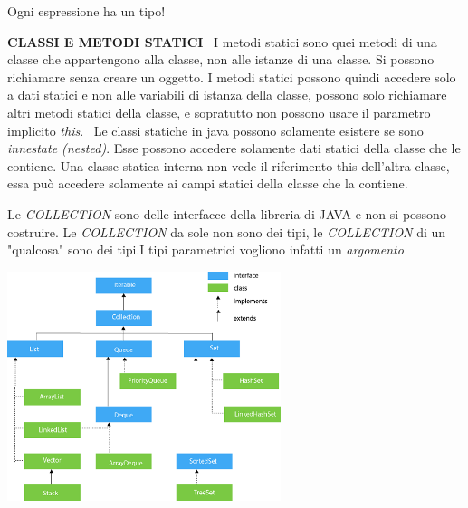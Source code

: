 \noindent Ogni espressione ha un tipo!

\noindent \textbf{CLASSI E METODI STATICI} \newline
\textbullet\ I metodi statici sono quei metodi di una classe che appartengono alla classe, non alle istanze di una classe. Si possono richiamare senza creare un oggetto. I metodi statici possono quindi accedere solo a dati statici e non alle variabili di istanza della classe, possono solo richiamare altri metodi statici della classe, e sopratutto non possono usare il parametro implicito \textit{this}. \newline
\textbullet\ Le classi statiche in java possono solamente esistere se sono \textit{innestate (nested)}. Esse possono accedere solamente dati statici della classe che le contiene. Una classe statica interna non vede il riferimento this dell'altra classe, essa può accedere solamente ai campi statici della classe che la contiene. 

\noindent Le \textit{COLLECTION} sono delle interfacce della libreria di JAVA e non si possono costruire.\newline
Le \textit{COLLECTION} da sole non sono dei tipi, le \textit{COLLECTION} di un "qualcosa" sono dei tipi.I tipi parametrici vogliono infatti un \textit{argomento} \newline
\begin{center}
\includegraphics[width=%
0.6\textwidth]{java-collection-hierarchy}
\end{center} 

